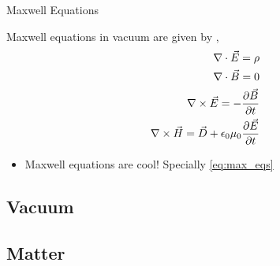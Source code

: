 \begin{frame}{Maxwell Equations}
\label{fr:intro_maxeq}

Maxwell equations in vacuum are given by \cite{Jackson:1999aa,Feynman:2010aa},
\begin{eqnarray}
\label{eq:max_eqs_1}
	\nabla \cdot \vec{E}=\rho 	\label{eq:max_eqs_1}\\
	\nabla \cdot \vec{B}=0		\label{eq:max_eqs_2}\\
	\nabla \times \vec{E}=-\frac{\partial \vec{B}}{\partial t}	\label{eq:max_eqs_3}\\
	\nabla \times \vec{H}=\vec{D} + \epsilon_0\mu_0 \frac{\partial \vec{E}}{\partial t} \label{eq:max_eqs_4}\\
\end{eqnarray}

\begin{itemize}
	\item Maxwell equations are cool! Specially \ref{eq:max_eqs}
\end{itemize}

\end{frame}

\subsection{Vacuum}
\label{sec:vacuum}



\subsection{Matter}
\label{sec:matter}





